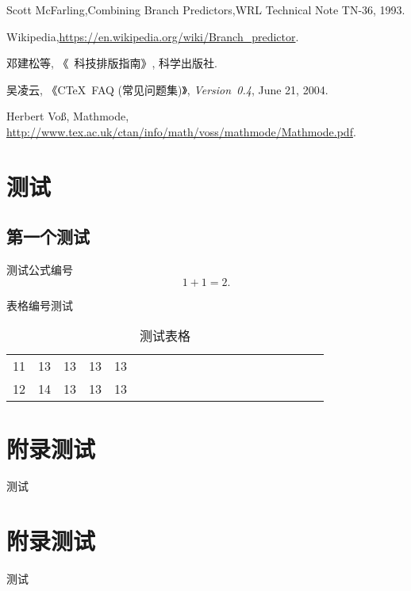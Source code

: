 \documentclass[forprint]{WHUBachelor}
\begin{document}
  
  
  \cleardoublepage{}
  \begin{thebibliography}{00}
  
     Scott McFarling,Combining Branch Predictors,WRL Technical Note TN-36, 1993.
  
     Wikipedia,\url{https://en.wikipedia.org/wiki/Branch_predictor}.
  
     邓建松等, 《\LaTeXe~科技排版指南》, 科学出版社.
  
     吴凌云, 《CTeX~FAQ (常见问题集)》, \textit{Version~0.4}, June 21, 2004.
  
     Herbert Vo\ss, Mathmode, \url{http://www.tex.ac.uk/ctan/info/math/voss/mathmode/Mathmode.pdf}.
  
  
  \end{thebibliography}
  
  
  \appendix
  
  \chapter{测试}
  
  \section{第一个测试}
  测试公式编号
  \begin{equation}
  1+1=2.
  \end{equation}
  
  表格编号测试
  
  \begin{table}[h]
    \centering
    \caption{测试表格}
    \begin{tabular}{*{20}c}
       \hline
       11 & 13  & 13  & 13  & 13 \\
       12 & 14  & 13  & 13  & 13 \\
       \hline
     \end{tabular}
  \end{table}
  
  
  \chapter{附录测试}
  
  测试
  
  \chapter{附录测试}
  
  测试
  
  \cleardoublepage
  
\end{document}
